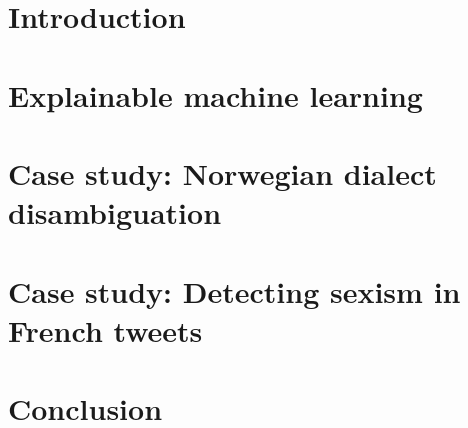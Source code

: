 \documentclass[a4paper, twoside, 12pt]{report}
\begin{document}

\startfrontmatter


\pagestyle{empty}


\newpage
\startindex

\newpage

\startmainmatter

\chapter{Introduction} 
\label{sec:intro}


\chapter{Explainable machine learning} 
\label{sec:explainable-ml}

\newpage


\newpage



\chapter{Case study: Norwegian dialect disambiguation} 
\label{sec:case-dialects}











\chapter{Case study: Detecting sexism in French tweets}
\label{sec:case-tweets}

\newpage


\newpage


\newpage


\newpage


\chapter{Conclusion} 





\end{document}
